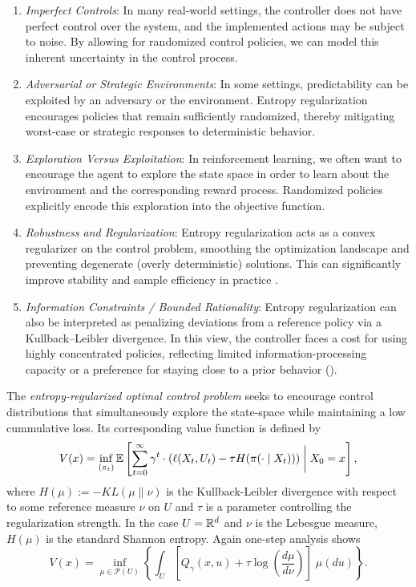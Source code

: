 \begin{enumerate}[label=(\roman*)]
    \item \textit{Imperfect Controls}: In many real-world settings, the controller does not have perfect control over the system, and the implemented actions may be subject to noise. By allowing for randomized control policies, we can model this inherent uncertainty in the control process.

    \item \textit{Adversarial or Strategic Environments}: In some settings, predictability can be exploited by an adversary or the environment. Entropy regularization encourages policies that remain sufficiently randomized, thereby mitigating worst-case or strategic responses to deterministic behavior.

    \item \textit{Exploration Versus Exploitation}: In reinforcement learning, we often want to encourage the agent to explore the state space in order to learn about the environment and the corresponding reward process. Randomized policies explicitly encode this exploration into the objective function.

    \item \textit{Robustness and Regularization}: Entropy regularization acts as a convex regularizer on the control problem, smoothing the optimization landscape and preventing degenerate (overly deterministic) solutions. This can significantly improve stability and sample efficiency in practice \cite{haarnoja2018_soft_actor_critic_arxiv}.

    \item \textit{Information Constraints / Bounded Rationality}: Entropy regularization can also be interpreted as penalizing deviations from a reference policy via a Kullback--Leibler divergence. In this view, the controller faces a cost for using highly concentrated policies, reflecting limited information-processing capacity or a preference for staying close to a prior behavior (\cite{ortega2015_information_theoretic_bounded_rationality}).
\end{enumerate}

The \textit{entropy-regularized optimal control problem} seeks to encourage control distributions
that simultaneously explore the state-space while maintaining a low cummulative loss. Its corresponding value function is defined by
%
\[V(x) = \inf_{(\pi_t)} \mathbb{E}\left[ \sum_{t=0}^\infty \gamma^t \cdot (\ell(X_t, U_t) - \tau H(\pi(\cdot \mid X_t)))\;\bigg\vert\; X_0 = x\right],\]
%
where $H(\mu) := -KL(\mu \parallel \nu)$ is the Kullback-Leibler divergence with respect to some reference measure $\nu$ on $U$ and $\tau$ is a parameter controlling the regularization strength. In the case
$U = \mathbb{R}^d$ and $\nu$ is the Lebesgue measure, $H(\mu)$ is the standard Shannon entropy.
Again one-step analysis shows
%
\begin{equation}
	V(x) = \inf_{\mu \in \mathcal{P}(U)} \left\{\int_U \left[Q_\gamma(x,u) + \tau \log\left(\frac{d\mu}{d\nu}\right)\right] \; \mu(du)  \right\}.
	\label{eqn:entropy_regularized_bellman_eqn}
\end{equation}

